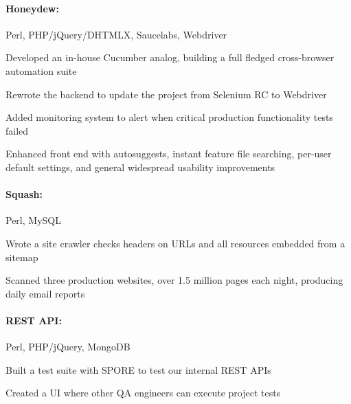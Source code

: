 \begin{position}

  \paragraph{Honeydew:} Perl, PHP/jQuery/DHTMLX, Saucelabs, Webdriver
  \begin{myitem}
  \item Developed an in-house Cucumber analog, building a full fledged cross-browser automation suite
  \item Rewrote the backend to update the project from Selenium RC to Webdriver
  \item Added monitoring system to alert when critical production functionality tests failed
  \item Enhanced front end with autosuggests, instant feature file searching, per-user default
    settings, and general widespread usability improvements
  \end{myitem}
%
%
  \paragraph{Squash:} Perl, MySQL
  \begin{myitem}
  \item Wrote a site crawler checks headers on URLs and all resources embedded from a sitemap
  \item Scanned three production websites, over 1.5 million pages each night, producing daily email reports
  \end{myitem}
%
  \paragraph{REST API:} Perl, PHP/jQuery, MongoDB
  \begin{myitem}
  \item Built a test suite with SPORE to test our internal REST APIs
  \item Created a UI where other QA engineers can execute project tests
  \end{myitem}
%

\end{position}
